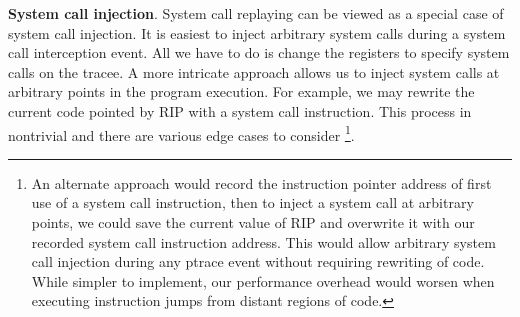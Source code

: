 \textbf{System call injection}. System call replaying can be viewed as a special case of system call injection. It is easiest to inject arbitrary system calls during a system call interception event. All we have to do is change the registers to specify system calls on the tracee. A more intricate approach allows us to inject system calls at arbitrary points in the program execution. For example, we may rewrite the current code pointed by RIP with a system call instruction. This process in nontrivial and there are various edge cases to consider \cite{instruction-punning} \footnote{An alternate approach would record the instruction pointer address of first use of a system call instruction, then to inject a system call at arbitrary points, we could save the current value of RIP and overwrite it with our recorded system call instruction address. This would allow arbitrary system call injection during any ptrace event without requiring rewriting of code. While simpler to implement, our performance overhead would worsen when executing instruction jumps from distant regions of code.}.
